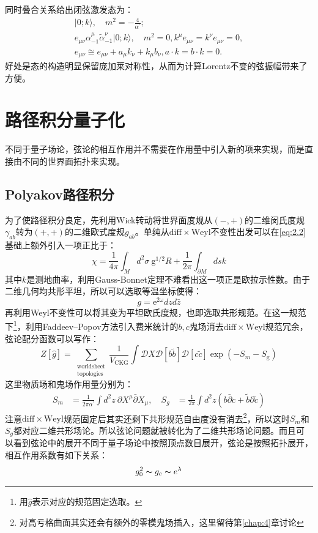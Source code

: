 同时叠合关系给出闭弦激发态为：
\begin{equation}
	\begin{gathered}
		|0;k\rangle,\quad m^2=-\frac{4}{\alpha^{\prime}};\\e_{\mu\nu}\alpha_{-1}^\mu\tilde{\alpha}_{-1}^\nu|0;k\rangle,\quad m^2=0,k^\mu e_{\mu\nu}=k^\nu e_{\mu\nu}=0,\\e_{\mu\nu}\cong e_{\mu\nu}+a_\mu k_\nu+k_\mu b_\nu,a\cdot k=b\cdot k=0.
	\end{gathered}
\end{equation}
好处是态的构造明显保留庞加莱对称性，从而为计算Lorentz不变的弦振幅带来了方便。
\section{路径积分量子化}
不同于量子场论，弦论的相互作用并不需要在作用量中引入新的项来实现，而是直接由不同的世界面拓扑来实现。
\subsection{Polyakov路径积分}
为了使路径积分良定，先利用Wick转动将世界面度规从$(-,+)$的二维闵氏度规$\gamma_{ab}$转为$(+,+)$的二维欧式度规$g_{ab}$。单纯从$\mathrm{diff}\times\mathrm{Weyl}$不变性出发可以在\ref{eq:2.2}基础上额外引入一项正比于：
\begin{equation}
	\chi=\frac{1}{4\pi}\int_Md^2\sigma\mathrm{~g}^{1/2}R+\frac{1}{2\pi}\int_{\partial M}dsk
\end{equation}
其中$k$是测地曲率，利用Gauss-Bonnet定理不难看出这一项正是欧拉示性数。由于二维几何均共形平坦，所以可以选取等温坐标使得：
\begin{equation}
	\label{eq:2.30}
	g = \mathrm{e}^{2\omega} dz d\bar z
\end{equation}
再利用Weyl不变性可以将其变为平坦欧氏度规，也即选取共形规范。在这一规范下\footnote{用$\hat g$表示对应的规范固定选取。}，利用Faddeev–Popov方法引入费米统计的$b,c$鬼场消去$\mathrm{diff}\times\mathrm{Weyl}$规范冗余，弦论配分函数可以写作：
\begin{equation}
	\label{eq:2.31}
	Z\left[\hat{g}\right]=\sum_{\substack{\text{worldsheet}\\\text{topologies}}}\frac{1}{V_{\mathrm{CKG}}}\int\mathcal{D}X\mathcal{D}[b\tilde{b}]\mathcal{D}[c\tilde{c}]\exp(-S_m-S_\mathrm{g})
\end{equation}
这里物质场和鬼场作用量分别为：
\begin{equation}
	\begin{aligned}
		S_m&=\frac{1}{2\pi\alpha^{\prime}}\int d^2z\mathrm{~}\partial X^\mu\bar{\partial}X_\mu,\quad
		S_g&=\frac{1}{2\pi}\int d^2z\left(b\bar\partial c+\tilde b\partial \tilde c\right)
	\end{aligned}
\end{equation}
注意$\mathrm{diff}\times\mathrm{Weyl}$规范固定后其实还剩下共形规范自由度没有消去\footnote{对高亏格曲面其实还会有额外的零模鬼场插入，这里留待第\ref{chap:4}章讨论}，所以这时$S_m$和$S_g$都对应二维共形场论。所以弦论问题就被转化为了二维共形场论问题。而且可以看到弦论中的展开不同于量子场论中按照顶点数目展开，弦论是按照拓扑展开，相互作用系数有如下关系：
\begin{equation}
	g_0^2\thicksim g_c\thicksim e^\lambda
\end{equation}

